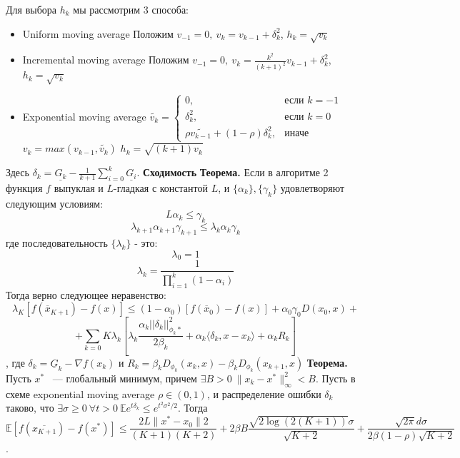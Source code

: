 \documentclass[oneside,final,12pt]{article}
\begin{document}
Для выбора $h_k$ мы рассмотрим 3 способа:\newline
\begin{itemize}
    \item Uniform moving average\newline
    Положим $v_{-1} = 0,\ v_k = v_{k - 1} + \delta_k^2$, $h_k = \sqrt{v_k}$
    \item Incremental moving average\newline
    Положим $v_{-1} = 0,\ v_k = \frac{k^2}{(k+1)^2}v_{k-1} + \delta_k^2$, $h_k = \sqrt{v_k}$
    \item Exponential moving average\newline
    $\widetilde{v_k} = \begin{cases}
    0,& \text{если } k = -1\\
    \delta_k^2,& \text{если } k = 0\\
    \rho\widetilde{v_{k-1}} + (1 - \rho)\delta_k^2,& \text{иначе}
    \end{cases}$\newline
    $v_k = max(v_{k - 1}, \widetilde{v_k})$\newline
    $h_k = \sqrt{(k + 1)v_k}$
\end{itemize}
Здесь $\delta_k = \underline{G_k} - \frac{1}{k+1}\sum\limits_{i=0}^k\underline{G_i}$.\newline
\break\noindent\textbf{\Large{Сходимость}}\newline
\newline\textbf{Теорема.}
Если в алгоритме 2 функция $f$ выпуклая и $L$-гладкая с константой $L$, и $\{\alpha_k\}, \{\gamma_k\}$ удовлетворяют следующим условиям:
$$
L\alpha_k \leq \gamma_k
$$$$
\lambda_{k + 1} \alpha_{k + 1}\gamma_{k + 1} \leq \lambda_k \alpha_k \gamma_k
$$
где последовательность $\{\lambda_k\}$ - это:
$$
\lambda_0 = 1
$$$$
\lambda_k = \frac{1}{\prod_{i = 1}^k(1 - \alpha_i)}
$$
Тогда верно следующее неравенство:
$$
\lambda_K \left[ f(\overline{x}_{K + 1}) - f(x)\right] \leq (1 - \alpha_0) \left[ 
f(\overline{x}_0) - f(x)
\right] + \alpha_0 \gamma_0 D(x_0, x) + 
$$
$$+\sum_{k = 0}K \lambda_k \left[
\lambda_k\frac{\alpha_k||\delta_k||^2_{\phi_k*}}{2\beta_k} + \alpha_k \langle \delta_k, x - x_k \rangle + \alpha_k R_k
\right]
$$, где $\delta_k = \underline{G}_k - \nabla f(x_k)$ и $R_k = \beta_k D_{\phi_k}(x_k, x) - \beta_k D_{\phi_k}(x_{k + 1}, x)$
\newline
\textbf{Теорема.}
Пусть $x^*$ ~--- глобальный минимум, причем $\exists B > 0\ \|x_k - x^*\|^2_\infty < B$. Пусть в схеме exponential moving average $\rho\in(0, 1)$, и распределение ошибки $\delta_k$ таково, что $\exists\sigma \ge 0\ \forall t > 0\ \mathbb{E}e^{t\delta_k}\le e^{t^2\sigma^2/2}$. Тогда $$\mathbb{E}[f(\overline{x_{K+1}}) - f(x^*)] \le \frac{2L\|x^* - x_0\|2}{(K + 1)(K + 2)} + 2\beta B\frac{\sqrt{2\log(2(K + 1))}\sigma}{\sqrt{K + 2}} + \frac{\sqrt{2\pi}d\sigma}{2\beta(1 - \rho)\sqrt{K + 2}}$$.\newline
\end{document}
